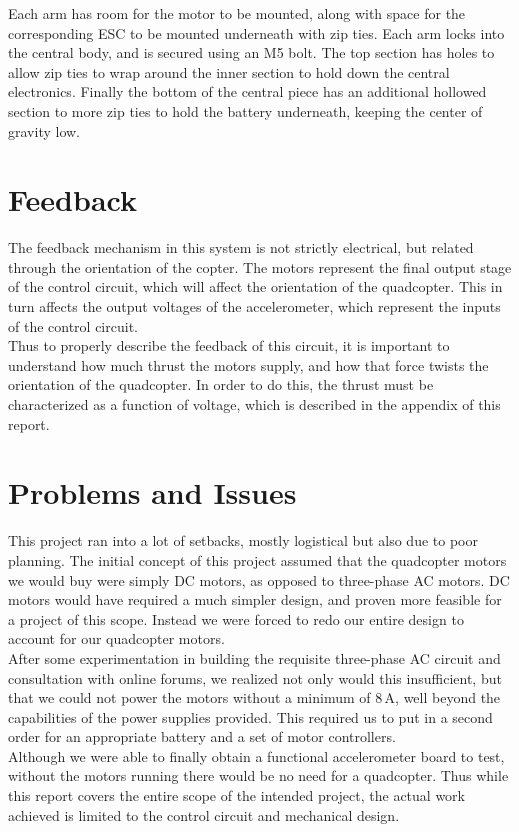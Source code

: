 \documentclass[11pt]{article} %
\begin{document}
Each arm has room for the motor to be mounted, along with space for the corresponding ESC to be mounted underneath with zip ties. Each arm locks into the central body, and is secured using an M5 bolt. The top section has holes to allow zip ties to wrap around the inner section to hold down the central electronics. Finally the bottom of the central piece has an additional hollowed section to more zip ties to hold the battery underneath, keeping the center of gravity low.
\section{Feedback}
The feedback mechanism in this system is not strictly electrical, but related through the orientation of the copter. The motors represent the final output stage of the control circuit, which will affect the orientation of the quadcopter. This in turn affects the output voltages of the accelerometer, which represent the inputs of the control circuit.\\
Thus to properly describe the feedback of this circuit, it is important to understand how much thrust the motors supply, and how that force twists the orientation of the quadcopter. In order to do this, the thrust must be characterized as a function of voltage, which is described in the appendix of this report.

\section{Problems and Issues}
This project ran into a lot of setbacks, mostly logistical but also due to poor planning. The initial concept of this project assumed that the quadcopter motors we would buy were simply DC motors, as opposed to three-phase AC motors. DC motors would have required a much simpler design, and proven more feasible for a project of this scope. Instead we were forced to redo our entire design to account for our quadcopter motors.\\
After some experimentation in building the requisite three-phase AC circuit and consultation with online forums, we realized not only would this insufficient, but that we could not power the motors without a minimum of 8\,A, well beyond the capabilities of the power supplies provided. This required us to put in a second order for an appropriate battery and a set of motor controllers.\\
Although we were able to finally obtain a functional accelerometer board to test, without the motors running there would be no need for a quadcopter. Thus while this report covers the entire scope of the intended project, the actual work achieved is limited to the control circuit and mechanical design.
\end{document}
